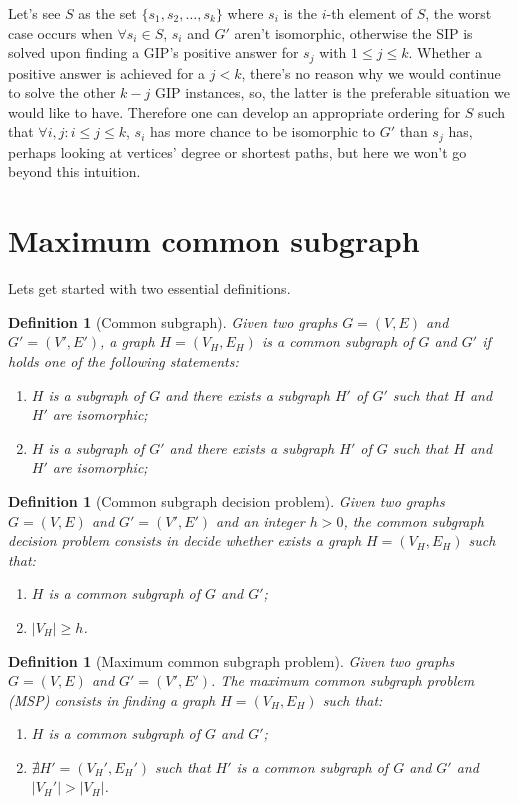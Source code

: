 \documentclass[a4paper,12pt]{article}
\theoremstyle{newplanestyle}
\theoremstyle{newdefinitionstyle}
\newtheorem{newdef}[newtheo]{Definition}
\theoremstyle{newprovestyle}
\begin{document}
Let's see $S$ as the set $\{s_1, s_2, \dots, s_k\}$ where $s_i$ is the $i$-th element of $S$, the worst case occurs when $\forall s_i \in S$, $s_i$ and $G'$ aren't isomorphic, otherwise the SIP is solved upon finding a GIP's positive answer for $s_j$ with $1 \leq j \leq k$. Whether a positive answer is achieved for a $j < k$, there's no reason why we would continue to solve the other $k - j$ GIP instances, so, the latter is the preferable situation we would like to have. Therefore one can develop an appropriate ordering for $S$ such that $\forall i,j :  i \leq j \leq k$, $s_i$ has more chance to be isomorphic to $G'$ than $s_j$ has, perhaps looking at vertices' degree or shortest paths, but here we won't go beyond this intuition. 

\cleardoublepage

\section{Maximum common subgraph}
Lets get started with two essential definitions.

\begin{newdef}[Common subgraph]
	Given two graphs $G=(V,E)$ and $G'=(V',E')$, a graph $H = (V_H, E_H)$ is a \textit{common subgraph} of $G$ and $G'$ if holds one of the following statements:
	\begin{enumerate}
		\item $H$ is a subgraph of $G$ and there exists a subgraph $H'$ of $G'$ such that $H$ and $H'$ are isomorphic;
		\item $H$ is a subgraph of $G'$ and there exists a subgraph $H'$ of $G$ such that $H$ and $H'$ are isomorphic;
	\end{enumerate}
\end{newdef}

\begin{newdef}[Common subgraph decision problem]
	Given two graphs $G=(V,E)$ and $G'=(V',E')$ and an integer $h > 0$, the \textit{common subgraph decision problem} consists in decide whether exists a graph $H = (V_H, E_H)$ such that:
	\begin{enumerate}[noitemsep]
		\item $H$ is a common subgraph of $G$ and $G'$;
		\item $|V_H| \geq h$.
	\end{enumerate}	
\end{newdef}

\begin{newdef}[Maximum common subgraph problem]
	Given two graphs $G=(V,E)$ and $G'=(V',E')$. The \textit{maximum common subgraph problem} (MSP) consists in finding a graph $H = (V_H, E_H)$ such that:
	\begin{enumerate}[noitemsep]
		\item $H$ is a common subgraph of $G$ and $G'$;
		\item $\nexists H'=(V_H', E_H')$ such that $H'$ is a common subgraph of $G$ and $G'$ and $|V_H'| > |V_H|$.
	\end{enumerate}	
\end{newdef}\label{def-msp}
\end{document}
